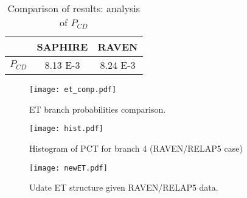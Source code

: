 \begin{table}
  \caption{Comparison of results: analysis of $P_{CD}$}
  \label{tab:case1_P_CD}
  \centering
  \begin{tabular}{c | c | c } 
    \hline 
             & SAPHIRE & RAVEN \\ 
    \hline 
    $P_{CD}$ & 8.13 E-3    & 8.24 E-3  \\
    \hline 
  \end{tabular}
\end{table}

\begin{figure}
    \centering
    \texttt{[image: et\_comp.pdf]}
    \caption{ET branch probabilities comparison.}
    \label{fig:et_comp}
\end{figure} 

\begin{figure}
    \centering
    \texttt{[image: hist.pdf]}
    \caption{Histogram of PCT for branch 4 (RAVEN/RELAP5 case)}
    \label{fig:hist_temp}
\end{figure} 

\begin{figure}
    \centering
    \texttt{[image: newET.pdf]}
    \caption{Udate ET structure given RAVEN/RELAP5 data.}
    \label{fig:newET}
\end{figure} 


